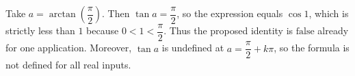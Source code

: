 Take $a=\arctan(\dfrac{\pi}{2})$. Then $\tan a=\dfrac{\pi}{2}$, so the expression equals $\cos 1$, which is strictly less than $1$ because $0<1<\dfrac{\pi}{2}$. Thus the proposed identity is $\boxed{\text{false}}$ already for one application. Moreover, $\tan a$ is undefined at $a=\dfrac{\pi}{2}+k\pi$, so the formula is not defined for all real inputs.
